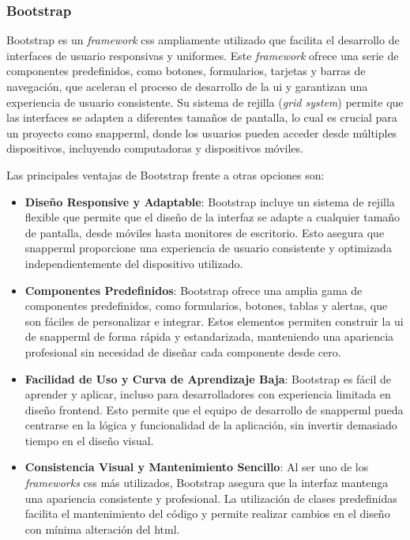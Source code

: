 \subsubsection{Bootstrap}

Bootstrap es un \textit{\gls{framework}} \acrshort{css} ampliamente utilizado que facilita el desarrollo de interfaces de usuario responsivas y uniformes. Este \textit{\gls{framework}} ofrece una serie de componentes predefinidos, como botones, formularios, tarjetas y barras de navegación, que aceleran el proceso de desarrollo de la \acrshort{ui} y garantizan una experiencia de usuario consistente. Su sistema de rejilla (\textit{grid system}) permite que las interfaces se adapten a diferentes tamaños de pantalla, lo cual es crucial para un proyecto como \Gls{snapperml}, donde los usuarios pueden acceder desde múltiples dispositivos, incluyendo computadoras y dispositivos móviles.

Las principales ventajas de Bootstrap frente a otras opciones son:

\begin{itemize}
    \item \textbf{Diseño Responsive y Adaptable}: Bootstrap incluye un sistema de rejilla flexible que permite que el diseño de la interfaz se adapte a cualquier tamaño de pantalla, desde móviles hasta monitores de escritorio. Esto asegura que \Gls{snapperml} proporcione una experiencia de usuario consistente y optimizada independientemente del dispositivo utilizado.
    \item \textbf{Componentes Predefinidos}: Bootstrap ofrece una amplia gama de componentes predefinidos, como formularios, botones, tablas y alertas, que son fáciles de personalizar e integrar. Estos elementos permiten construir la \acrshort{ui} de \Gls{snapperml} de forma rápida y estandarizada, manteniendo una apariencia profesional sin necesidad de diseñar cada componente desde cero.

    \item \textbf{Facilidad de Uso y Curva de Aprendizaje Baja}: Bootstrap es fácil de aprender y aplicar, incluso para desarrolladores con experiencia limitada en diseño \gls{frontend}. Esto permite que el equipo de desarrollo de \Gls{snapperml} pueda centrarse en la lógica y funcionalidad de la aplicación, sin invertir demasiado tiempo en el diseño visual.

    \item \textbf{Consistencia Visual y Mantenimiento Sencillo}: Al ser uno de los \textit{\glspl{framework}} \acrshort{css} más utilizados, Bootstrap asegura que la interfaz mantenga una apariencia consistente y profesional. La utilización de clases predefinidas facilita el mantenimiento del código y permite realizar cambios en el diseño con mínima alteración del \acrshort{html}.
\end{itemize}


